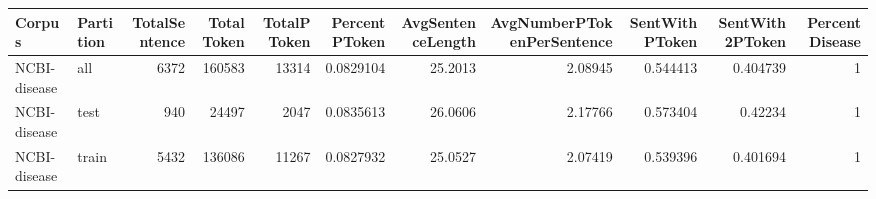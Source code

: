 \begin{tabular}{llrrrrrrrrr}
\hline
 Corpus       & Partition   &   TotalSentence &   TotalToken &   TotalPToken &   PercentPToken &   AvgSentenceLength &   AvgNumberPTokenPerSentence &   SentWithPToken &   SentWith2PToken &   PercentDisease \\
\hline
 NCBI-disease & all         &            6372 &       160583 &         13314 &       0.0829104 &             25.2013 &                      2.08945 &         0.544413 &          0.404739 &                1 \\
 NCBI-disease & test        &             940 &        24497 &          2047 &       0.0835613 &             26.0606 &                      2.17766 &         0.573404 &          0.42234  &                1 \\
 NCBI-disease & train       &            5432 &       136086 &         11267 &       0.0827932 &             25.0527 &                      2.07419 &         0.539396 &          0.401694 &                1 \\
\hline
\end{tabular}